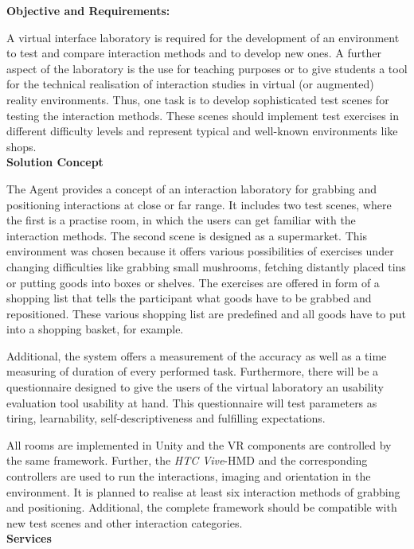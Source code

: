 \documentclass[a4paper, 12pt]{article}
\begin{document}
\textbf{Objective and Requirements:}

A virtual interface laboratory is required for the development of an environment to test and compare interaction methods and to develop new ones. A further aspect of the laboratory is the use for teaching purposes or to give students a tool for the technical realisation of interaction studies in virtual (or augmented) reality environments. Thus, one task is to develop sophisticated test scenes for testing the interaction methods. These scenes should implement test exercises in different difficulty levels and represent typical and well-known environments like shops. \\

\textbf{Solution Concept}
 
  The Agent provides a concept of an interaction laboratory for grabbing and positioning interactions at close or far range. It includes two test scenes, where the first is a practise room, in which the users can get familiar with the interaction methods. The second scene is designed as a supermarket. This environment was chosen because it offers various possibilities of exercises under changing difficulties like grabbing small mushrooms, fetching distantly placed tins or putting goods into boxes or shelves. The exercises are offered in form of a shopping list that tells the participant what goods have to be grabbed and repositioned. These various shopping list are predefined and all goods have to put into a shopping basket, for example. 
  
  Additional, the system offers a measurement of the accuracy as well as a time measuring of duration of every performed task. Furthermore, there will be a questionnaire designed to give the users of the virtual laboratory an usability evaluation tool usability at hand. This questionnaire will test parameters as tiring, learnability, self-descriptiveness and fulfilling expectations.
 
 All rooms are implemented in Unity and the VR components are controlled by the same framework. Further, the \textit{HTC Vive}-HMD and the corresponding controllers are used to run the interactions, imaging and orientation in the environment. It is planned to realise at least six interaction methods of grabbing and positioning. Additional, the complete framework should be compatible with new test scenes and other interaction categories. \\

 
\textbf{Services}
\end{document}
